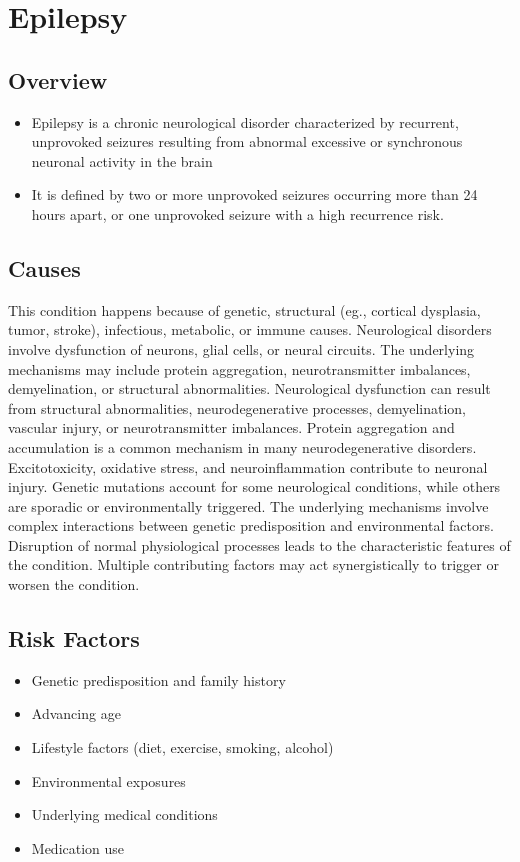 \chapter{Epilepsy}
\label{sec:Epilepsy}

\section{Overview}


\begin{itemize}[noitemsep]
  \item Epilepsy is a chronic neurological disorder characterized by recurrent, unprovoked seizures resulting from abnormal excessive or synchronous neuronal activity in the brain
  \item It is defined by two or more unprovoked seizures occurring more than 24 hours apart, or one unprovoked seizure with a high recurrence risk.
\end{itemize}
\section{Causes}
This condition happens because of genetic, structural (eg., cortical dysplasia, tumor, stroke), infectious, metabolic, or immune causes. Neurological disorders involve dysfunction of neurons, glial cells, or neural circuits. The underlying mechanisms may include protein aggregation, neurotransmitter imbalances, demyelination, or structural abnormalities. Neurological dysfunction can result from structural abnormalities, neurodegenerative processes, demyelination, vascular injury, or neurotransmitter imbalances. Protein aggregation and accumulation is a common mechanism in many neurodegenerative disorders. Excitotoxicity, oxidative stress, and neuroinflammation contribute to neuronal injury. Genetic mutations account for some neurological conditions, while others are sporadic or environmentally triggered. The underlying mechanisms involve complex interactions between genetic predisposition and environmental factors. Disruption of normal physiological processes leads to the characteristic features of the condition. Multiple contributing factors may act synergistically to trigger or worsen the condition.
\section{Risk Factors}
\begin{itemize}[noitemsep]
  \item Genetic predisposition and family history
  \item Advancing age
  \item Lifestyle factors (diet, exercise, smoking, alcohol)
  \item Environmental exposures
  \item Underlying medical conditions
  \item Medication use
\end{itemize}
